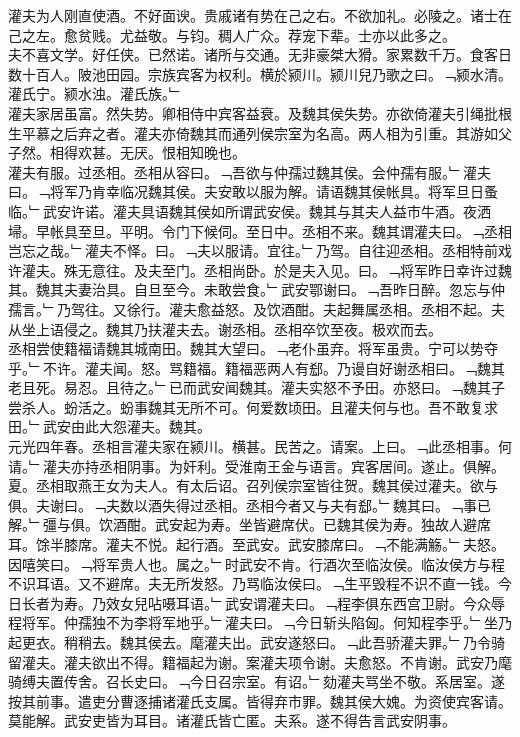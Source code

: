 \documentclass{zhvt-classic}
\begin{document}
\hspace*{2em}灌夫为人刚直使酒。不好面谀。贵戚诸有势在己之右。不欲加礼。必陵之。诸士在己之左。愈贫贱。尤益敬。与钧。稠人广众。荐宠下辈。士亦以此多之。\\
\hspace*{2em}夫不喜文学。好任侠。已然诺。诸所与交通。无非豪桀大猾。家累数千万。食客日数十百人。陂池田园。宗族宾客为权利。横於颍川。颍川兒乃歌之曰。﹁颍水清。灌氏宁。颍水浊。灌氏族。﹂\\
\hspace*{2em}灌夫家居虽富。然失势。卿相侍中宾客益衰。及魏其侯失势。亦欲倚灌夫引绳批根生平慕之后弃之者。灌夫亦倚魏其而通列侯宗室为名高。两人相为引重。其游如父子然。相得欢甚。无厌。恨相知晚也。\\
\hspace*{2em}灌夫有服。过丞相。丞相从容曰。﹁吾欲与仲孺过魏其侯。会仲孺有服。﹂灌夫曰。﹁将军乃肯幸临况魏其侯。夫安敢以服为解。请语魏其侯帐具。将军旦日蚤临。﹂武安许诺。灌夫具语魏其侯如所谓武安侯。魏其与其夫人益市牛酒。夜洒埽。早帐具至旦。平明。令门下候伺。至日中。丞相不来。魏其谓灌夫曰。﹁丞相岂忘之哉。﹂灌夫不怿。曰。﹁夫以服请。宜往。﹂乃驾。自往迎丞相。丞相特前戏许灌夫。殊无意往。及夫至门。丞相尚卧。於是夫入见。曰。﹁将军昨日幸许过魏其。魏其夫妻治具。自旦至今。未敢尝食。﹂武安鄂谢曰。﹁吾昨日醉。忽忘与仲孺言。﹂乃驾往。又徐行。灌夫愈益怒。及饮酒酣。夫起舞属丞相。丞相不起。夫从坐上语侵之。魏其乃扶灌夫去。谢丞相。丞相卒饮至夜。极欢而去。\\
\hspace*{2em}丞相尝使籍福请魏其城南田。魏其大望曰。﹁老仆虽弃。将军虽贵。宁可以势夺乎。﹂不许。灌夫闻。怒。骂籍福。籍福恶两人有郄。乃谩自好谢丞相曰。﹁魏其老且死。易忍。且待之。﹂已而武安闻魏其。灌夫实怒不予田。亦怒曰。﹁魏其子尝杀人。蚡活之。蚡事魏其无所不可。何爱数顷田。且灌夫何与也。吾不敢复求田。﹂武安由此大怨灌夫。魏其。\\
\hspace*{2em}元光四年春。丞相言灌夫家在颍川。横甚。民苦之。请案。上曰。﹁此丞相事。何请。﹂灌夫亦持丞相阴事。为奸利。受淮南王金与语言。宾客居间。遂止。俱解。\\
\hspace*{2em}夏。丞相取燕王女为夫人。有太后诏。召列侯宗室皆往贺。魏其侯过灌夫。欲与俱。夫谢曰。﹁夫数以酒失得过丞相。丞相今者又与夫有郄。﹂魏其曰。﹁事已解。﹂彊与俱。饮酒酣。武安起为寿。坐皆避席伏。已魏其侯为寿。独故人避席耳。馀半膝席。灌夫不悦。起行酒。至武安。武安膝席曰。﹁不能满觞。﹂夫怒。因嘻笑曰。﹁将军贵人也。属之。﹂时武安不肯。行酒次至临汝侯。临汝侯方与程不识耳语。又不避席。夫无所发怒。乃骂临汝侯曰。﹁生平毁程不识不直一钱。今日长者为寿。乃效女兒呫嗫耳语。﹂武安谓灌夫曰。﹁程李俱东西宫卫尉。今众辱程将军。仲孺独不为李将军地乎。﹂灌夫曰。﹁今日斩头陷匈。何知程李乎。﹂坐乃起更衣。稍稍去。魏其侯去。麾灌夫出。武安遂怒曰。﹁此吾骄灌夫罪。﹂乃令骑留灌夫。灌夫欲出不得。籍福起为谢。案灌夫项令谢。夫愈怒。不肯谢。武安乃麾骑缚夫置传舍。召长史曰。﹁今日召宗室。有诏。﹂劾灌夫骂坐不敬。系居室。遂按其前事。遣吏分曹逐捕诸灌氏支属。皆得弃市罪。魏其侯大媿。为资使宾客请。莫能解。武安吏皆为耳目。诸灌氏皆亡匿。夫系。遂不得告言武安阴事。\\
\end{document}
